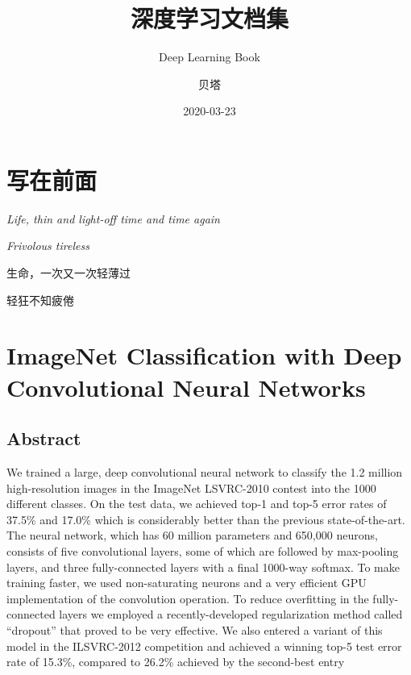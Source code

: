 \documentclass[12pt,a4paper,UTF8,twoside]{book}
\title{深度学习文档集}
\subtitle{Deep Learning Book}
\author{贝塔}
\date{2020-03-23}
\begin{document}





{
\setcounter{tocdepth}{2}
\tableofcontents
}

\hypertarget{ux5199ux5728ux524dux9762}{%
\chapter{写在前面}\label{ux5199ux5728ux524dux9762}}

\emph{Life, thin and light-off time and time again}

\emph{Frivolous tireless}

生命，一次又一次轻薄过

轻狂不知疲倦

\hypertarget{Alexnet}{%
\chapter{ImageNet Classification with Deep Convolutional Neural Networks}\label{Alexnet}}

\hypertarget{abstract}{%
\section{Abstract}\label{abstract}}

We trained a large, deep convolutional neural network to classify the 1.2 million high-resolution images in the ImageNet LSVRC-2010 contest into the 1000 different classes. On the test data, we achieved top-1 and top-5 error rates of 37.5\% and 17.0\% which is considerably better than the previous state-of-the-art. The neural network, which has 60 million parameters and 650,000 neurons, consists of five convolutional layers, some of which are followed by max-pooling layers, and three fully-connected layers with a final 1000-way softmax. To make training faster, we used non-saturating neurons and a very efficient GPU implementation of the convolution operation. To reduce overfitting in the fully-connected layers we employed a recently-developed regularization method called ``dropout'' that proved to be very effective. We also entered a variant of this model in the ILSVRC-2012 competition and achieved a winning top-5 test error rate of 15.3\%, compared to 26.2\% achieved by the second-best entry
\end{document}
